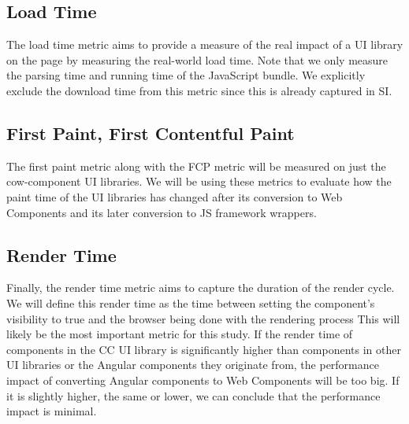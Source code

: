 \subsection{Load Time}
The load time metric aims to provide a measure of the real impact of a UI library on the page by measuring the real-world load time. Note that we only measure the parsing time and running time of the JavaScript bundle. We explicitly exclude the download time from this metric since this is already captured in SI\@.

\subsection{First Paint, First Contentful Paint}
The first paint metric along with the FCP metric will be measured on just the cow-component UI libraries. We will be using these metrics to evaluate how the paint time of the UI libraries has changed after its conversion to Web Components and its later conversion to JS framework wrappers.

\subsection{Render Time}
Finally, the render time metric aims to capture the duration of the render cycle. We will define this render time as the time between setting the component's visibility to true and the browser being done with the rendering process This will likely be the most important metric for this study. If the render time of components in the CC UI library is significantly higher than components in other UI libraries or the Angular components they originate from, the performance impact of converting Angular components to Web Components will be too big. If it is slightly higher, the same or lower, we can conclude that the performance impact is minimal.

